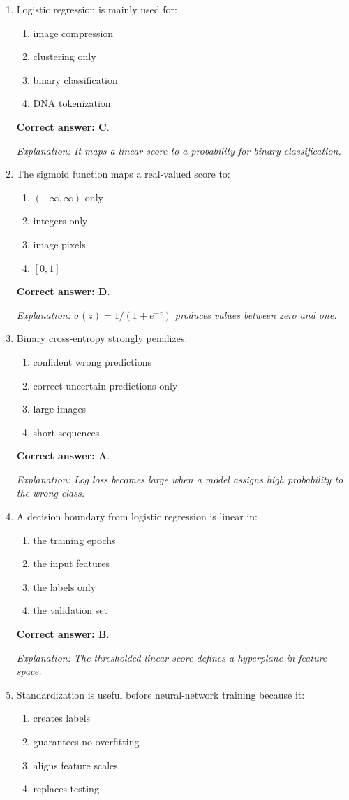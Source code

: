 \documentclass[10pt,a4paper]{article}
\newcommand{\ans}[1]{\par\textbf{Correct answer: #1}}
\newcommand{\expn}[1]{\par\textit{Explanation: #1}}
\begin{document}
\begin{enumerate}[label=\textbf{\arabic*.},itemsep=4pt]
\ans{B}. \expn{Gradient descent follows downhill directions on the convex cost surface.}
\item Logistic regression is mainly used for:
\begin{enumerate}[label=\Alph*.,itemsep=0pt]\item image compression\item clustering only\item binary classification\item DNA tokenization\end{enumerate}
\ans{C}. \expn{It maps a linear score to a probability for binary classification.}
\item The sigmoid function maps a real-valued score to:
\begin{enumerate}[label=\Alph*.,itemsep=0pt]\item $(-\infty,\infty)$ only\item integers only\item image pixels\item $[0,1]$\end{enumerate}
\ans{D}. \expn{$\sigma(z)=1/(1+e^{-z})$ produces values between zero and one.}
\item Binary cross-entropy strongly penalizes:
\begin{enumerate}[label=\Alph*.,itemsep=0pt]\item confident wrong predictions\item correct uncertain predictions only\item large images\item short sequences\end{enumerate}
\ans{A}. \expn{Log loss becomes large when a model assigns high probability to the wrong class.}
\item A decision boundary from logistic regression is linear in:
\begin{enumerate}[label=\Alph*.,itemsep=0pt]\item the training epochs\item the input features\item the labels only\item the validation set\end{enumerate}
\ans{B}. \expn{The thresholded linear score defines a hyperplane in feature space.}
\item Standardization is useful before neural-network training because it:
\begin{enumerate}[label=\Alph*.,itemsep=0pt]\item creates labels\item guarantees no overfitting\item aligns feature scales\item replaces testing\end{enumerate}

\end{enumerate}
\end{document}
